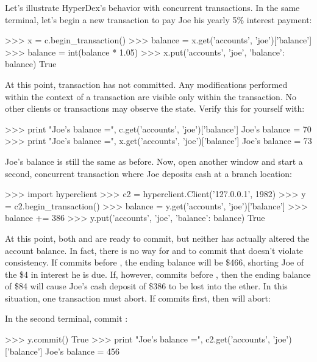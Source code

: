 Let's illustrate HyperDex's behavior with concurrent transactions.
In the same terminal, let's begin a new transaction to pay Joe his yearly
5\% interest payment:

\begin{pyconcode}
>>> x = c.begin_transaction()
>>> balance = x.get('accounts', 'joe')['balance']
>>> balance = int(balance * 1.05)
>>> x.put('accounts', 'joe', {'balance': balance})
True
\end{pyconcode}

At this point, transaction  has not committed.  Any modifications performed
within the context of a transaction are visible only within the transaction.  No
other clients or transactions may observe the state.  Verify this for yourself
with:

\begin{pyconcode}
>>> print "Joe's balance =", c.get('accounts', 'joe')['balance']
Joe's balance = 70
>>> print "Joe's balance =", x.get('accounts', 'joe')['balance']
Joe's balance = 73
\end{pyconcode}

Joe's balance is still the same as before.  Now, open another window and start a
second, concurrent transaction where Joe deposits cash at a branch location:

\begin{pyconcode}
>>> import hyperclient
>>> c2 = hyperclient.Client('127.0.0.1', 1982)
>>> y = c2.begin_transaction()
>>> balance = y.get('accounts', 'joe')['balance']
>>> balance += 386
>>> y.put('accounts', 'joe', {'balance': balance})
True
\end{pyconcode}

At this point, both  and  are ready to commit, but neither has
actually altered the account balance.  In fact, there is no way for  and
 to commit that doesn't violate consistency.  If  commits before
, the ending balance will be \$466, shorting Joe of the \$4 in interest
he is due.  If, however,  commits before , then the ending
balance of \$84 will cause Joe's cash deposit of \$386 to be lost into the
ether.  In this situation, one transaction must abort.  If  commits
first, then  will abort:

In the second terminal, commit :

\begin{pyconcode}
>>> y.commit()
True
>>> print "Joe's balance =", c2.get('accounts', 'joe')['balance']
Joe's balance = 456
\end{pyconcode}

